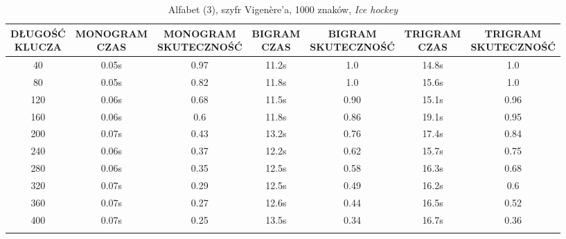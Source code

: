 \documentclass[a4paper]{article}
\theoremstyle{defn}
\theoremstyle{theorem}
\theoremstyle{lemma}
\theoremstyle{cor}
\theoremstyle{fact}
\begin{document}
\begin{center}\begin{small}\begin{longtable}{|c|c|c|c|c|c|c|} 
\hline \makecell{DŁUGOŚĆ\\KLUCZA} &  \makecell{MONOGRAM\\CZAS} & \makecell{MONOGRAM\\SKUTECZNOŚĆ} & \makecell{BIGRAM\\CZAS} &  \makecell{BIGRAM\\SKUTECZNOŚĆ} & \makecell{TRIGRAM\\CZAS} & \makecell{TRIGRAM\\SKUTECZNOŚĆ}\\ \hline 
40 & 0.05s & 0.97 & 11.2s & 1.0 & 14.8s & 1.0 \\ \hline 
80 & 0.05s & 0.82 & 11.8s & 1.0 & 15.6s & 1.0 \\ \hline 
120 & 0.06s & 0.68 & 11.5s & 0.90 & 15.1s & 0.96 \\ \hline 
160 & 0.06s & 0.6 & 11.8s & 0.86 & 19.1s & 0.95 \\ \hline 
200 & 0.07s & 0.43 & 13.2s & 0.76 & 17.4s & 0.84 \\ \hline 
240 & 0.06s & 0.37 & 12.2s & 0.62 & 15.7s & 0.75 \\ \hline 
280 & 0.06s & 0.35 & 12.5s & 0.58 & 16.3s & 0.68 \\ \hline 
320 & 0.07s & 0.29 & 12.5s & 0.49 & 16.2s & 0.6 \\ \hline 
360 & 0.07s & 0.27 & 12.6s & 0.44 & 16.5s & 0.52 \\ \hline 
400 & 0.07s & 0.25 & 13.5s & 0.34 & 16.7s & 0.36 \\ \hline 
\caption{Alfabet (3), szyfr Vigenère'a, 1000 znaków, \textit{Ice hockey}}
\end{longtable}\end{small}\end{center} 
\end{document}
